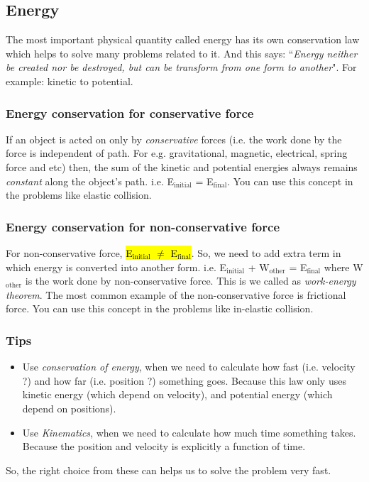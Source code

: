 \documentclass[12pt,a4paper]{article}
\DeclareRobustCommand{\hlgray}[1]{{\sethlcolor{lightgray}\hl{#1}}}
\begin{document}
\subsection{Energy}

The most important physical quantity called energy has its own conservation law which helps to solve many problems related to it. And this says: ``\emph{Energy neither be created nor be destroyed, but can be transform from one form to another}". For example: kinetic to potential.

\subsubsection{Energy conservation for conservative force} \label{ecf}

If an object is acted on only by \emph{conservative} forces (i.e. the work done by the force is independent of path. For e.g. gravitational, magnetic, electrical, spring force and etc) then, the sum of the kinetic and potential energies always remains \emph{constant} along the object's path. i.e. E$_\text{initial}$ = E$_\text{final}$. You can use this concept in the problems like elastic collision.

\subsubsection{Energy conservation for non-conservative force}

For non-conservative force, \hlgray{E$_\text{initial}$ $\neq$ E$_\text{final}$}. So, we need to add extra term in which energy is converted into another form. i.e. E$_\text{initial}$ + W$_\text{other}$ = E$_\text{final}$ where W$_\text{other}$ is the work done by non-conservative force. This is we called as \emph{work-energy theorem}. The most common example of the non-conservative force is frictional force. You can use this concept in the problems like in-elastic collision.

\subsubsection*{Tips}
\begin{itemize}
\item Use \emph{conservation of energy}, when we need to calculate how fast (i.e. velocity ?) and how far (i.e. position ?) something goes. Because this law only uses kinetic energy (which depend on velocity), and potential energy (which depend on positions).
\item Use \emph{Kinematics}, when we need to calculate how much time something takes. Because the position and velocity is explicitly a function of time.
\end{itemize}
So, the right choice from these can helps us to solve the problem very fast.
\end{document}
